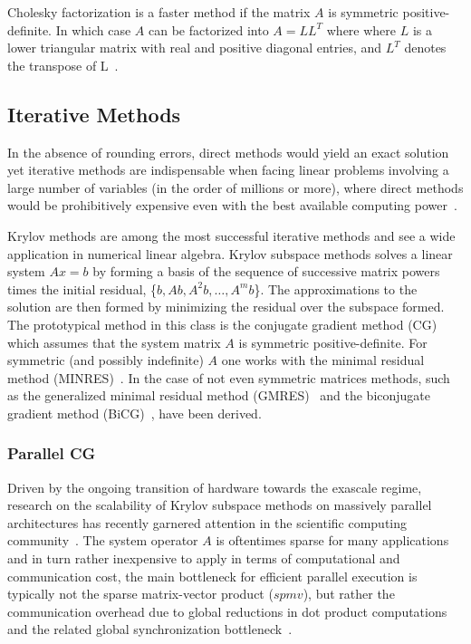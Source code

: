 Cholesky factorization is a faster method if the matrix $A$ is symmetric 
positive-definite. In which case $A$ can be factorized into $A = LL^T$ where 
where $L$ is a lower triangular matrix with real and positive diagonal entries, 
and $L^T$ denotes the transpose of L~\cite{nla}.

\subsection{Iterative Methods}
In the absence of rounding errors, direct methods would yield an exact solution 
yet iterative methods are indispensable when facing linear problems involving a 
large number of variables (in the order of millions or more), where direct 
methods would be prohibitively expensive even with the best available computing 
power~\cite{nla}. 

Krylov methods are among the most successful iterative methods and see a wide 
application in numerical linear algebra. Krylov subspace methods solves a linear 
system $Ax = b$ by forming a basis of the sequence of successive matrix powers 
times the initial residual, \{$b, Ab, A^2b, \ldots, A^mb$\}. The approximations 
to the solution are then formed by minimizing the residual over the subspace 
formed. The prototypical method in this class is the conjugate gradient method 
(CG)~\cite{cg} which assumes that the system matrix $A$ is symmetric 
positive-definite. For symmetric (and possibly indefinite) $A$ one works with 
the minimal residual method (MINRES)~\cite{minres}. In the case of not even 
symmetric matrices methods, such as the generalized minimal residual method 
(GMRES)~\cite{gmres} and the biconjugate gradient method (BiCG)~\cite{bicg}, 
have been derived.

\subsubsection{Parallel CG}
Driven by the ongoing transition of hardware towards the exascale regime,
research on the scalability of Krylov subspace methods on massively parallel
architectures has recently garnered attention in the scientific computing
community~\cite{plcg2}. The system operator $A$ is oftentimes sparse for many
applications and in turn rather inexpensive to apply in terms of
computational and communication cost, the main bottleneck for efficient
parallel execution is typically not the sparse matrix-vector product
($spmv$), but rather the communication overhead due to global reductions in
dot product computations and the related global synchronization
bottleneck~\cite{plcg}.

